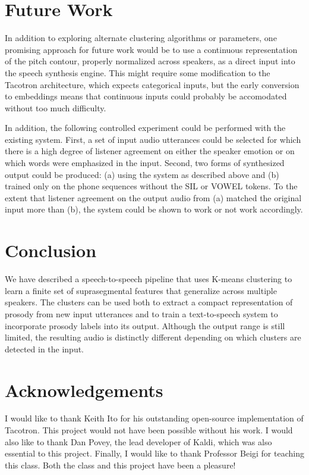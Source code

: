 \documentclass{article}
\begin{document}
\section{Future Work}
\label{sec:futurework}

In addition to exploring alternate clustering algorithms or parameters, one promising approach for future work would be to use a continuous representation of the pitch contour, properly normalized across speakers, as a direct input into the speech synthesis engine.
This might require some modification to the Tacotron architecture, which expects categorical inputs, but the early conversion to embeddings means that continuous inputs could probably be accomodated without too much difficulty.

In addition, the following controlled experiment could be performed with the existing system. First, a set of input audio utterances could be selected for which there is a high degree of listener agreement on either the speaker emotion or on which words were emphasized in the input. Second, two forms of synthesized output could be produced: (a) using the system as described above and (b) trained only on the phone sequences without the SIL or VOWEL tokens.
To the extent that listener agreement on the output audio from (a) matched the original input more than (b), the system could be shown to work or not work accordingly.

\section{Conclusion}
\label{sec:conclusion}
We have described a speech-to-speech pipeline that uses K-means clustering to learn a finite set of suprasegmental features that generalize across multiple speakers. The clusters can be used both to extract a compact representation of prosody from new input utterances and to train a text-to-speech system to incorporate prosody labels into its output. Although the output range is still limited, the resulting audio is distinctly different depending on which clusters are detected in the input.

\section{Acknowledgements}
\label{sec:acknowledgements}
I would like to thank Keith Ito for his outstanding open-source implementation of Tacotron. This project would not have been possible without his work. I would also like to thank Dan Povey, the lead developer of Kaldi, which was also essential to this project. Finally, I would like to thank Professor Beigi for teaching this class. Both the class and this project have been a pleasure!



\end{document}
